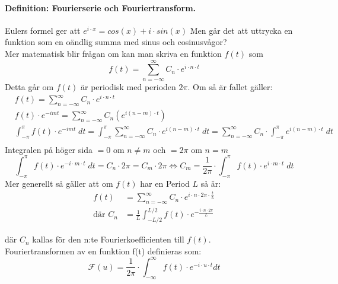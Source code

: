 \documentclass{article}%
\begin{document}
\paragraph{Definition: Fourierserie och Fouriertransform. \\}
Eulers formel ger att $e^{i \cdot x} = cos(x) + i \cdot sin(x)$ Men går det att uttrycka en funktion som en oändlig summa
med sinus och cosinusvågor?\\
Mer matematisk blir frågan om kan man skriva en funktion $f(t)$ som 
$$f(t) = \sum_{n = - \infty}^\infty C_n \cdot e^{i \cdot n \cdot t}$$%
Detta går om $f(t)$ är periodisk med perioden $2 \pi$. Om så är fallet gäller:
\begin{align*}
	&f(t) = \sum_{n = - \infty}^\infty C_n \cdot e^{i \cdot n \cdot t} \\
	&f(t) \cdot e^{-imt} = \sum_{n = - \infty}^\infty C_n(e^{i(n - m) \cdot t}) \\
	&\int_{-\pi}^\pi f(t) \cdot e^{-imt}\; dt= \int_{-\pi}^\pi \sum_{n = - \infty}^\infty C_n \cdot e^{i(n - m) \cdot t}\; dt=
	\sum_{n = - \infty}^\infty C_n \cdot \int_{-\pi}^\pi e^{i (n - m) \cdot t}\; dt\\
\end{align*}
Integralen på höger sida $= 0 $ om $n \ne m$ och $= 2\pi $ om $n = m$
$$\int_{-\pi}^\pi f(t) \cdot e^{-i \cdot m \cdot t}\; dt= C_n \cdot 2\pi = C_m \cdot 2\pi \Leftrightarrow C_m = \frac 1 {2\pi} \cdot
\int_{-\pi}^\pi f(t) \cdot e^{i \cdot m \cdot t}\; dt$$
Mer generellt så gäller att om $f(t)$ har en Period $L$ så är:
\begin{align*}
	f(t) &= \sum_{n = - \infty}^\infty C_n \cdot e^{i \cdot n \cdot 2\pi \cdot \frac t L} \\ %
	\text{där } C_n &= \frac 1 L \int_{- L / 2}^{L / 2} f(t) \cdot e^{- \frac {i \cdot n \cdot 2\pi} {L}} 
\end{align*} %

där $C_n$ kallas för den n:te Fourierkoefficienten till $f(t)$. \\
Fouriertransformen av en funktion f(t) definieras som:
$$\mathcal{F}(u) = \frac 1 {2\pi} \cdot \int_{-\infty}^\infty f(t) \cdot e^{- i \cdot u \cdot t} dt$$
\end{document}
